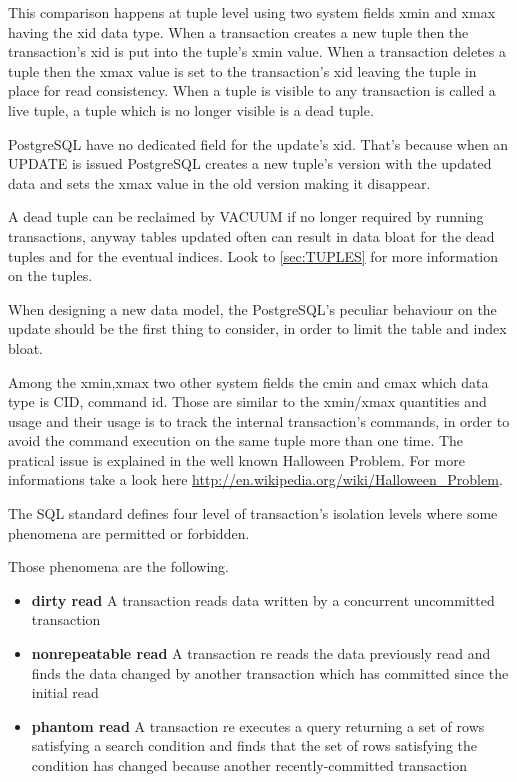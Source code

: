 This comparison happens at tuple level using two system fields xmin and xmax 
having the xid data type. 
When a transaction creates a new tuple then the transaction's xid is put into 
the tuple's xmin value. 
When a transaction deletes a tuple then the xmax value is set to the 
transaction's xid leaving the tuple in place for read consistency. 
When a tuple is visible to any transaction is called a live tuple, a tuple 
which is no longer visible is a dead tuple.\newline

PostgreSQL have no dedicated field for the update's xid. That's because when an 
UPDATE is issued PostgreSQL creates a new tuple's version with the updated 
data and sets the xmax value in the old version making it disappear.\newline

A dead tuple can be reclaimed by VACUUM if no longer required by running 
transactions, anyway tables updated often can result in data bloat for the dead 
tuples and for the eventual indices.
Look to \ref{sec:TUPLES} for more information on the 
tuples.\newline

When designing a new data model, the PostgreSQL's peculiar behaviour on the 
update should be the first thing to consider, in order to limit the table 
and index bloat. \newline

Among the xmin,xmax two other system fields the cmin and cmax which data type 
is CID, command id. Those are similar to the xmin/xmax quantities and usage 
and their usage is to track the internal transaction's commands, in order to 
avoid the command execution on the same tuple more than one time. The pratical 
issue is explained in the well known Halloween Problem. For more informations 
take a look here 
\href{http://en.wikipedia.org/wiki/Halloween_Problem}{
http://en.wikipedia.org/wiki/Halloween\_Problem}.\newline

The SQL standard defines four level of transaction's isolation levels where 
some phenomena are permitted or forbidden.

Those phenomena are the following.

\begin{itemize}
 \item \textbf{dirty read} A transaction reads data written by a concurrent 
uncommitted transaction

\item \textbf{nonrepeatable read} A transaction re reads the data previously 
read and finds the data changed by another transaction which has
committed since the initial read

\item \textbf{phantom read} A transaction re executes a query returning a set 
of rows satisfying a search condition and finds that the set of rows 
satisfying the condition has changed because another recently-committed 
transaction

\end{itemize}

